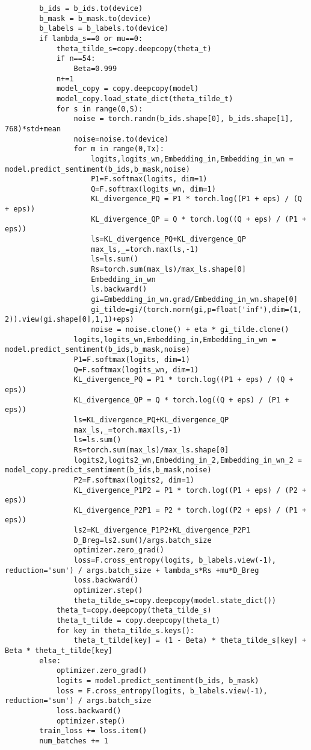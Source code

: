 \begin{lstlisting}
        b_ids = b_ids.to(device)
        b_mask = b_mask.to(device)
        b_labels = b_labels.to(device)
        if lambda_s==0 or mu==0:
            theta_tilde_s=copy.deepcopy(theta_t)
            if n==54:
                Beta=0.999
            n+=1
            model_copy = copy.deepcopy(model)
            model_copy.load_state_dict(theta_tilde_t)
            for s in range(0,S):
                noise = torch.randn(b_ids.shape[0], b_ids.shape[1], 768)*std+mean
                noise=noise.to(device)
                for m in range(0,Tx):
                    logits,logits_wn,Embedding_in,Embedding_in_wn = model.predict_sentiment(b_ids,b_mask,noise)
                    P1=F.softmax(logits, dim=1)
                    Q=F.softmax(logits_wn, dim=1)
                    KL_divergence_PQ = P1 * torch.log((P1 + eps) / (Q + eps))
                    KL_divergence_QP = Q * torch.log((Q + eps) / (P1 + eps))
                    ls=KL_divergence_PQ+KL_divergence_QP
                    max_ls,_=torch.max(ls,-1)
                    ls=ls.sum()
                    Rs=torch.sum(max_ls)/max_ls.shape[0]
                    Embedding_in_wn
                    ls.backward()
                    gi=Embedding_in_wn.grad/Embedding_in_wn.shape[0]
                    gi_tilde=gi/(torch.norm(gi,p=float('inf'),dim=(1, 2)).view(gi.shape[0],1,1)+eps)
                    noise = noise.clone() + eta * gi_tilde.clone()
                logits,logits_wn,Embedding_in,Embedding_in_wn = model.predict_sentiment(b_ids,b_mask,noise)
                P1=F.softmax(logits, dim=1)
                Q=F.softmax(logits_wn, dim=1)
                KL_divergence_PQ = P1 * torch.log((P1 + eps) / (Q + eps))
                KL_divergence_QP = Q * torch.log((Q + eps) / (P1 + eps))
                ls=KL_divergence_PQ+KL_divergence_QP
                max_ls,_=torch.max(ls,-1)
                ls=ls.sum()
                Rs=torch.sum(max_ls)/max_ls.shape[0]
                logits2,logits2_wn,Embedding_in_2,Embedding_in_wn_2 = model_copy.predict_sentiment(b_ids,b_mask,noise)
                P2=F.softmax(logits2, dim=1)
                KL_divergence_P1P2 = P1 * torch.log((P1 + eps) / (P2 + eps))
                KL_divergence_P2P1 = P2 * torch.log((P2 + eps) / (P1 + eps))
                ls2=KL_divergence_P1P2+KL_divergence_P2P1
                D_Breg=ls2.sum()/args.batch_size
                optimizer.zero_grad()
                loss=F.cross_entropy(logits, b_labels.view(-1), reduction='sum') / args.batch_size + lambda_s*Rs +mu*D_Breg
                loss.backward()
                optimizer.step()
                theta_tilde_s=copy.deepcopy(model.state_dict())
            theta_t=copy.deepcopy(theta_tilde_s)
            theta_t_tilde = copy.deepcopy(theta_t)
            for key in theta_tilde_s.keys():
                theta_t_tilde[key] = (1 - Beta) * theta_tilde_s[key] + Beta * theta_t_tilde[key]
        else:
            optimizer.zero_grad()
            logits = model.predict_sentiment(b_ids, b_mask)
            loss = F.cross_entropy(logits, b_labels.view(-1), reduction='sum') / args.batch_size
            loss.backward()
            optimizer.step()
        train_loss += loss.item()
        num_batches += 1


\end{lstlisting}
